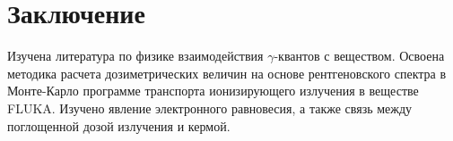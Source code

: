 % 
%

\section*{\center Заключение}

Изучена литература по физике взаимодействия $\gamma$-квантов с веществом. Освоена методика расчета дозиметрических величин на основе рентгеновского спектра в Монте-Карло программе транспорта ионизирующего излучения в веществе FLUKA. Изучено явление электронного равновесия, а также связь между поглощенной дозой излучения и кермой.

